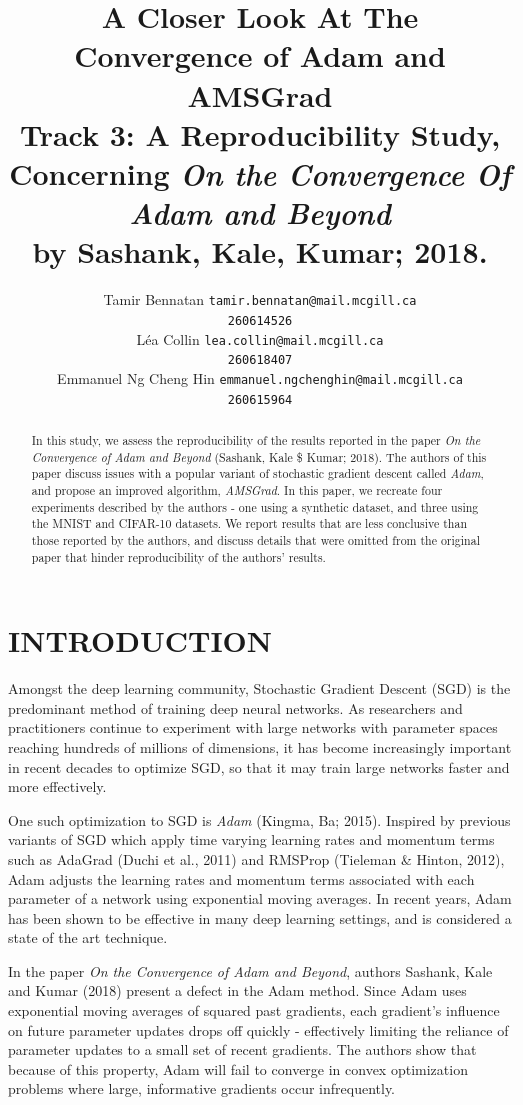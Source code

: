 \documentclass[letterpaper, 10 pt, conference]{ieeeconf}  %
\title{
A Closer Look At The Convergence of Adam and AMSGrad \\
\large Track 3: A Reproducibility Study, Concerning \emph{On the Convergence Of Adam and Beyond} \\
by Sashank, Kale, Kumar; 2018.
}
\author{ 
	\parbox{2 in}{\centering Tamir Bennatan
         {\tt\small tamir.bennatan@mail.mcgill.ca\\}
         {\tt\small 260614526}}
         \hspace*{ 0.3 in}
         \parbox{2 in}{\centering L\'ea Collin
         {\tt\small lea.collin@mail.mcgill.ca\\}
         {\tt\small 260618407}}
         \hspace*{0.3 in}
         \parbox{2 in}{\centering Emmanuel Ng Cheng Hin
         {\tt\small emmanuel.ngchenghin@mail.mcgill.ca\\}
         {\tt\small 260615964}}
}
\begin{document}
\maketitle
\thispagestyle{empty}
\pagestyle{empty}

\begin{abstract}
In this study, we assess the reproducibility of the results reported in the paper \emph{On the Convergence of Adam and Beyond} (Sashank, Kale \$ Kumar; 2018). The authors of this paper discuss issues with a popular variant of stochastic gradient descent called \emph{Adam}, and propose an improved algorithm, \emph{AMSGrad}. In this paper, we recreate four experiments described by the authors - one using a synthetic dataset, and three using the MNIST and CIFAR-10 datasets. We report results that are less conclusive than those reported by the authors, and discuss details that were omitted from the original paper that hinder reproducibility of the authors' results.
\end{abstract}

\section{INTRODUCTION}

Amongst the deep learning community, Stochastic Gradient Descent (SGD) is the predominant method of training deep neural networks. As researchers and practitioners continue to experiment with large networks with parameter spaces reaching hundreds of millions of dimensions, it has become increasingly important in recent decades to optimize SGD, so that it may train large networks faster and more effectively. 

One such optimization to SGD is \emph{Adam} (Kingma, Ba; 2015). Inspired by previous variants of SGD which  apply time varying learning rates and momentum terms such as AdaGrad (Duchi et al.,
2011) and RMSProp (Tieleman \& Hinton, 2012), Adam adjusts the learning rates and momentum terms associated with each parameter of a network using exponential moving averages. In recent years, Adam has been shown to be effective in many deep learning settings, and is considered a state of the art technique. 

In the paper \emph{On the Convergence of Adam and Beyond}, authors Sashank, Kale and Kumar (2018) present a defect in the Adam method. Since Adam uses exponential moving averages of squared past gradients, each gradient's influence on future parameter updates drops off quickly - effectively limiting the reliance of parameter updates to a small set of recent gradients. The authors show that because of this property, Adam will fail to converge in convex optimization problems where large, informative gradients occur infrequently. 
\end{document}
